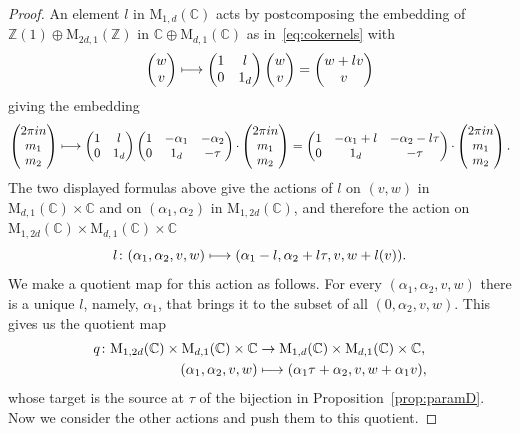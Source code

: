 \documentclass[11pt]{article}
\providecommand{\C}{}
\def\mto{\mathchoice{\longmapsto}{\mapsto}{\mapsto}{\mapsto}}
\theoremstyle{plain}
\theoremstyle{definition}
\numberwithin{equation}{subsection}
\renewcommand{\C}{\mathbb C}
\newcommand{\Z}{\mathbb Z}
\newcommand{\rmM}{\mathrm{M}}
\begin{document}
\begin{proof}
An element $l$ in $\rmM_{1,d}(\C)$ acts by postcomposing the embedding
of $\Z(1)\oplus\rmM_{2d,1}(\Z)$ in $\C\oplus \rmM_{d,1}(\C)$ as
in~\eqref{eq:cokernels} with
\[
\begin{pmatrix}
w \\v
\end{pmatrix}
\mto
\begin{pmatrix}
1 & l\\0 &1_d
\end{pmatrix}
\begin{pmatrix}
w \\v
\end{pmatrix}
=
\begin{pmatrix}
w +lv\\v
\end{pmatrix}
\]
giving the embedding
\[
\begin{pmatrix}
2\pi in\\ m_1\\ m_2
\end{pmatrix}
 \mto
\begin{pmatrix}
1 & l\\0 & 1_d
\end{pmatrix}
\begin{pmatrix}
1 & -\alpha_1 & -\alpha_2\\0 & 1_d & -\tau
\end{pmatrix}{\cdot}
\begin{pmatrix}
2\pi in\\ m_1\\ m_2
\end{pmatrix} %
 =
\begin{pmatrix}
1 & -\alpha_1+l & -\alpha_2-l\tau\\0 & 1_d & -\tau
\end{pmatrix}{\cdot}
\begin{pmatrix}
2\pi in\\ m_1\\ m_2
\end{pmatrix}.
\]
The two displayed formulas above give the actions of $l$ on $(v,w)$ in
$\rmM_{d,1}(\C)\times\C$ and on $(\alpha_1,\alpha_2)$ in
$\rmM_{1,2d}(\C)$, and therefore the action on
$\rmM_{1,2d}(\C)\times\rmM_{d,1}(\C)\times\C$
\[
l\colon (\alpha_1,\alpha_2,v,w)\mto (\alpha_1-l,\alpha_2+l\tau,v,w+l(v)).
\]
We make a quotient map for this action as follows. For every
$(\alpha_1,\alpha_2,v,w)$ there is a unique $l$, namely, $\alpha_1$,
that brings it to the subset of all $(0,\alpha_2,v,w)$. This gives us
the quotient map
\[
\begin{aligned}
q\colon  \rmM_{1,2d}(\C)\times\rmM_{d,1}(\C)\times\C &\to
\rmM_{1,d}(\C)\times\rmM_{d,1}(\C)\times\C,\\
 (\alpha_1,\alpha_2,v,w)&\mto (\alpha_1\tau+\alpha_2,v,w+\alpha_1v),
\end{aligned}
\]
whose target is the source at $\tau$ of the bijection in Proposition~\ref{prop:paramD}.
Now we consider the other actions and push them to this quotient.


\end{proof}
\end{document}
